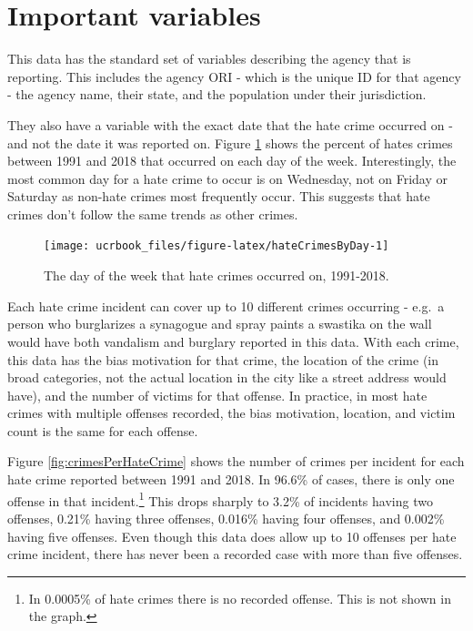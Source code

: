 \documentclass[
  12pt,
  openany]{book}
\begin{document}
\hypertarget{important-variables-6}{%
\section{Important variables}\label{important-variables-6}}

This data has the standard set of variables describing the agency that is reporting. This includes the agency ORI - which is the unique ID for that agency - the agency name, their state, and the population under their jurisdiction.

They also have a variable with the exact date that the hate crime occurred on - and not the date it was reported on. Figure \ref{fig:hateCrimesByDay} shows the percent of hates crimes between 1991 and 2018 that occurred on each day of the week. Interestingly, the most common day for a hate crime to occur is on Wednesday, not on Friday or Saturday as non-hate crimes most frequently occur. This suggests that hate crimes don't follow the same trends as other crimes.

\begin{figure}

{\centering \texttt{[image: ucrbook\_files/figure-latex/hateCrimesByDay-1]} 

}

\caption{The day of the week that hate crimes occurred on, 1991-2018.}\label{fig:hateCrimesByDay}
\end{figure}

Each hate crime incident can cover up to 10 different crimes occurring - e.g.~a person who burglarizes a synagogue and spray paints a swastika on the wall would have both vandalism and burglary reported in this data. With each crime, this data has the bias motivation for that crime, the location of the crime (in broad categories, not the actual location in the city like a street address would have), and the number of victims for that offense. In practice, in most hate crimes with multiple offenses recorded, the bias motivation, location, and victim count is the same for each offense.

Figure \ref{fig:crimesPerHateCrime} shows the number of crimes per incident for each hate crime reported between 1991 and 2018. In 96.6\% of cases, there is only one offense in that incident.\footnote{In 0.0005\% of hate crimes there is no recorded offense. This is not shown in the graph.} This drops sharply to 3.2\% of incidents having two offenses, 0.21\% having three offenses, 0.016\% having four offenses, and 0.002\% having five offenses. Even though this data does allow up to 10 offenses per hate crime incident, there has never been a recorded case with more than five offenses.
\end{document}
